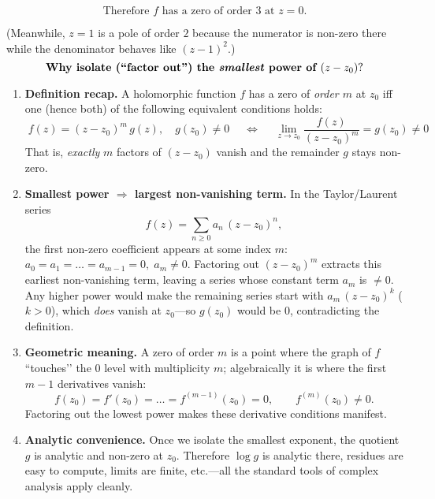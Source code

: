 \documentclass[12pt]{article}
\theoremstyle{definition} %
\theoremstyle{plain} %
\begin{document}
\bigskip
\[
\boxed{\;
\text{Therefore } f \text{ has a zero of order } 3 \text{ at } z=0.
\;}
\]

(Meanwhile, \(z=1\) is a pole of order \(2\) because the numerator
is non-zero there while the denominator behaves like \((z-1)^{2}\).)
\[
\textbf{Why isolate (“factor out’’) the \emph{smallest} power of }
      (z-z_{0})?
\]

\begin{enumerate}
\item \textbf{Definition recap.}  
      A holomorphic function \(f\) has a zero of \emph{order \(m\)} at
      \(z_{0}\) iff one (hence both) of the following equivalent
      conditions holds:
      \[
      \boxed{\;
        f(z) = (z-z_{0})^{m}\,g(z),
        \quad g(z_{0})\neq0
      \;}
      \quad\Longleftrightarrow\quad
      \boxed{\;
        \displaystyle
        \lim_{z\to z_{0}}\frac{f(z)}{(z-z_{0})^{m}} = g(z_{0})\neq0
      \;}
      \]
      That is, \emph{exactly} \(m\) factors of \((z-z_{0})\) vanish and
      the remainder \(g\) stays non-zero.

\item \textbf{Smallest power \(\Rightarrow\) largest non-vanishing term.}  
      In the Taylor/Laurent series
      \[
      f(z)=\sum_{n\ge0} a_{n}\,(z-z_{0})^{n},
      \]
      the first non-zero coefficient appears at some index \(m\):
      \(a_{0}=a_{1}=\dots=a_{m-1}=0,\;a_{m}\neq0\).
      Factoring out \((z-z_{0})^{m}\) extracts this earliest
      non-vanishing term, leaving a series whose constant term
      \(a_{m}\) is \(\neq0\).  Any higher power would make the
      remaining series start with \(a_{m}\,(z-z_{0})^{k}\) (\(k>0\)),
      which \emph{does} vanish at \(z_{0}\)—so \(g(z_{0})\) would be
      \(0\), contradicting the definition.

\item \textbf{Geometric meaning.}  
      A zero of order
      \(m\) is a point where the graph of \(f\) “touches’’ the \(0\)
      level with multiplicity \(m\); algebraically it is where
      the first \(m-1\) derivatives vanish:
      \[
        f(z_{0})=f'(z_{0})=\dots=f^{(m-1)}(z_{0})=0,
        \qquad f^{(m)}(z_{0})\neq0.
      \]
      Factoring out the lowest power makes these derivative conditions
      manifest.

\item \textbf{Analytic convenience.}  
      Once we isolate the smallest exponent, the quotient \(g\) is
      analytic and non-zero at \(z_{0}\).  Therefore
      \(\log g\) is analytic there, residues are easy to
      compute, limits are finite, etc.—all the standard tools of
      complex analysis apply cleanly.

\end{enumerate}
\end{document}
